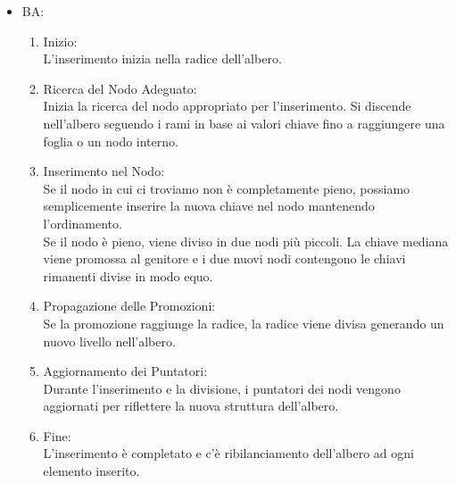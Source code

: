 \begin{itemize}
\begin{itemize}
        \item BA:
        \begin{enumerate}
            \item Inizio:\\
                L'inserimento inizia nella radice dell'albero.
            \item Ricerca del Nodo Adeguato:\\
                Inizia la ricerca del nodo appropriato per l'inserimento. Si discende nell'albero seguendo i rami in base ai valori chiave fino a raggiungere una foglia o un nodo interno.
            \item Inserimento nel Nodo:\\
                Se il nodo in cui ci troviamo non è completamente pieno, possiamo semplicemente inserire la nuova chiave nel nodo mantenendo l'ordinamento.\\
                Se il nodo è pieno, viene diviso in due nodi più piccoli. La chiave mediana viene promossa al genitore e i due nuovi nodi contengono le chiavi rimanenti divise in modo equo.
            \item Propagazione delle Promozioni:\\
                Se la promozione raggiunge la radice, la radice viene divisa generando un nuovo livello nell'albero.
            \item Aggiornamento dei Puntatori:\\
                Durante l'inserimento e la divisione, i puntatori dei nodi vengono aggiornati per riflettere la nuova struttura dell'albero.
            \item Fine:\\
                L'inserimento è completato e c'è ribilanciamento dell'albero ad ogni elemento inserito.
        \end{enumerate}
    \end{itemize}
    

\end{itemize}
